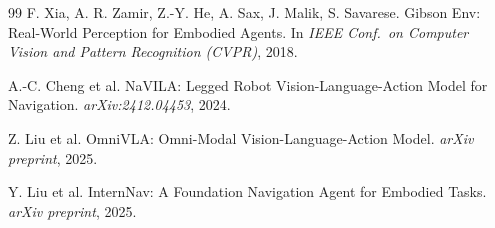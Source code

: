 \documentclass[11pt,a4paper]{article}
\begin{document}
\begin{thebibliography}{99}
F. Xia, A. R. Zamir, Z.-Y. He, A. Sax, J. Malik, S. Savarese.
\newblock Gibson Env: Real-World Perception for Embodied Agents.
\newblock In \emph{IEEE Conf.\ on Computer Vision and Pattern Recognition (CVPR)}, 2018.

A.-C. Cheng et al.
\newblock NaVILA: Legged Robot Vision-Language-Action Model for Navigation.
\newblock \emph{arXiv:2412.04453}, 2024.

Z. Liu et al.
\newblock OmniVLA: Omni-Modal Vision-Language-Action Model.
\newblock \emph{arXiv preprint}, 2025.

Y. Liu et al.
\newblock InternNav: A Foundation Navigation Agent for Embodied Tasks.
\newblock \emph{arXiv preprint}, 2025.

\end{thebibliography}
\end{document}
